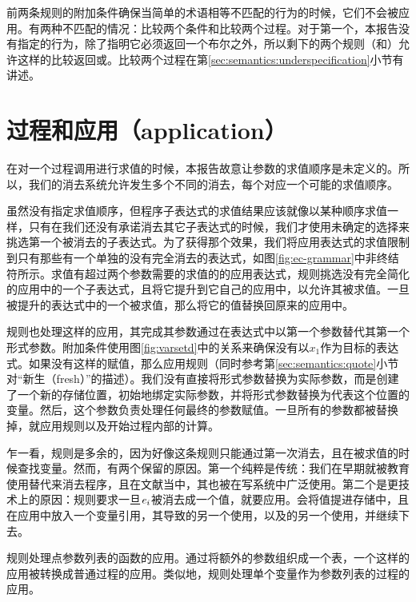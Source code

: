 前两条规则的附加条件确保当简单的术语相等不匹配的行为的时候，它们不会被应用。有两种不匹配的情况：比较两个条件和比较两个过程。对于第一个，本报告没有指定的行为，除了指明它必须返回一个布尔之外，所以剩下的两个规则（和）允许这样的比较返回\semtrue{}或\semfalse{}。比较两个过程在第\ref{sec:semantics:underspecification}小节有讲述。

\section{过程和应用（application）}

在对一个过程调用进行求值的时候，本报告故意让参数的求值顺序是未定义的。所以，我们的消去系统允许发生多个不同的消去，每个对应一个可能的求值顺序。

虽然没有指定求值顺序，但程序子表达式的求值结果应该就像以某种顺序求值一样，只有在我们还没有承诺消去其它子表达式的时候，我们才使用未确定的选择来挑选第一个被消去的子表达式。为了获得那个效果，我们将应用表达式的求值限制到只有那些有一个单独的没有完全消去的表达式，如图\ref{fig:ec-grammar}中非终结符所示。求值有超过两个参数需要的求值的的应用表达式，规则挑选没有完全简化的应用中的一个子表达式，且将它提升到它自己的应用中，以允许其被求值。一旦被提升的表达式中的一个被求值，那么将它的值替换回原来的应用中。

规则也处理这样的应用，其完成其参数通过在表达式中以第一个参数替代其第一个形式参数。附加条件使用图\ref{fig:varsetd}中的关系来确保没有以$x_1$作为目标的表达式。如果没有这样的赋值，那么应用规则（同时参考第\ref{sec:semantics:quote}小节对“新生（fresh）”的描述）。我们没有直接将形式参数替换为实际参数，而是创建了一个新的存储位置，初始地绑定实际参数，并将形式参数替换为代表这个位置的变量。然后，这个参数负责处理任何最终的参数赋值。一旦所有的参数都被替换掉，就应用规则以及开始过程内部的计算。

乍一看，规则是多余的，因为好像这条规则只能通过第一次消去，且在被求值的时候查找变量。然而，有两个保留的原因。第一个纯粹是传统：我们在早期就被教育使用替代来消去程序，且在文献当中，其也被在写系统中广泛使用。第二个是更技术上的原因：规则要求一旦$\textnormal{\textit{e}}_i$被消去成一个值，就要应用。会将值提进存储中，且在应用中放入一个变量引用，其导致的另一个使用，以及的另一个使用，并继续下去。

规则处理点参数列表的函数的应用。通过将额外的参数组织成一个表，一个这样的应用被转换成普通过程的应用。类似地，规则处理单个变量作为参数列表的过程的应用。

